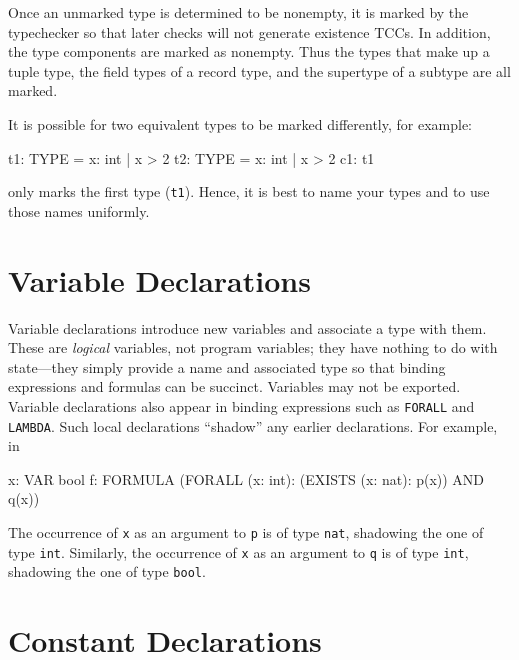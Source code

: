 Once an unmarked type is determined to be nonempty, it is marked by the
typechecker so that later checks will not generate existence TCCs.  In
addition, the type components are marked as nonempty.  Thus the types that
make up a tuple type, the field types of a record type, and the supertype
of a subtype are all marked.

It is possible for two equivalent types to be marked differently, for
example:
\begin{pvsex}
  t1: TYPE = \setb{}x: int | x > 2\sete
  t2: TYPE = \setb{}x: int | x > 2\sete
  c1: t1
\end{pvsex}
only marks the first type (\texttt{t1}).  Hence, it is best to name your types and
to use those names uniformly.


\section{Variable Declarations}

Variable declarations introduce new variables and associate a type with
them.  These are \emph{logical} variables, not program variables; they
have nothing to do with state---they simply provide a name and associated
type so that binding expressions and formulas can be succinct.
Variables may not be exported.  Variable
declarations also appear in binding expressions such as \texttt{FORALL} and
\texttt{LAMBDA}.  Such local declarations ``shadow'' any earlier
declarations.  For example, in
\begin{pvsex}
  x: VAR bool
  f: FORMULA (FORALL (x: int): (EXISTS (x: nat): p(x)) AND q(x))
\end{pvsex}
%
The occurrence of \texttt{x} as an argument to \texttt{p} is of type
\texttt{nat}, shadowing the one of type \texttt{int}.  Similarly, the
occurrence of \texttt{x} as an argument to \texttt{q} is of type
\texttt{int}, shadowing the one of type \texttt{bool}.


\section{Constant Declarations}\label{constants}

